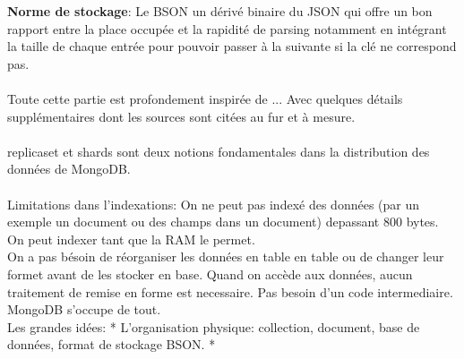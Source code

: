 \noindent \textbf{Norme de stockage}: Le \textsf{BSON} un dérivé binaire du \textsf{JSON} qui offre un bon rapport entre la place occupée et la rapidité de parsing notamment en intégrant la taille de chaque entrée pour pouvoir passer à la suivante si la clé ne correspond pas.
\\
\\
Toute cette partie est profondement inspirée de ... Avec quelques détails supplémentaires dont les sources sont citées 
au fur et à mesure.
\\
\\
\textsf{replicaset et shards} sont deux notions fondamentales dans la distribution des données de MongoDB.
\\
\\
Limitations dans l'indexations:
On ne peut pas indexé des données (par un exemple un document ou des champs dans un document) depassant 800 bytes.
\\
On peut indexer tant que la RAM le permet.
\\
On a pas bésoin de réorganiser les données en table en table ou de changer leur formet avant de les stocker en base. Quand on accède aux données, aucun traitement de remise en forme est necessaire. Pas besoin d'un code intermediaire. MongoDB s'occupe de tout. 
\\
Les grandes idées:
* L'organisation physique: collection, document, base de données, format de stockage BSON.
* 
